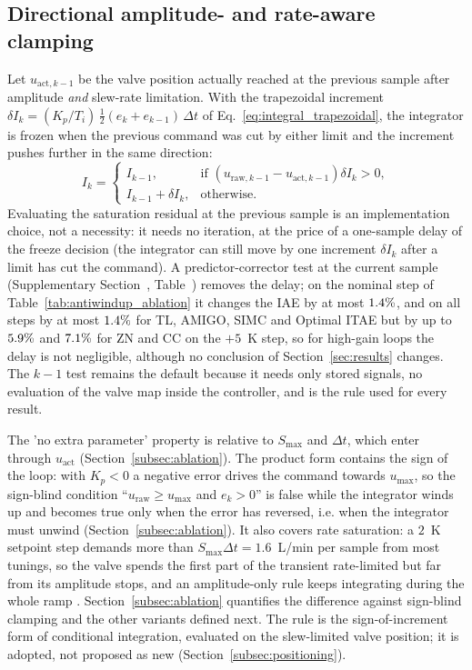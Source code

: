 \subsection{Directional amplitude- and rate-aware clamping}
\label{subsec:clamping_rule}
Let $u_{\text{act},k-1}$ be the valve position actually reached at the previous sample after amplitude \emph{and} slew-rate limitation. With the trapezoidal increment $\delta I_k = (K_p/T_i)\,\tfrac{1}{2}(e_k + e_{k-1})\,\Delta t$ of Eq.~\eqref{eq:integral_trapezoidal}, the integrator is frozen when the previous command was cut by either limit and the increment pushes further in the same direction:
\begin{equation}
    I_k = \begin{cases}
        I_{k-1}, & \text{if } \left(u_{\text{raw},k-1} - u_{\text{act},k-1}\right)\delta I_k > 0, \\
        I_{k-1} + \delta I_k, & \text{otherwise.}
    \end{cases}
    \label{eq:clamping_antiwindup}
\end{equation}
Evaluating the saturation residual at the previous sample is an implementation choice, not a necessity: it needs no iteration, at the price of a one-sample delay of the freeze decision (the integrator can still move by one increment $\delta I_k$ after a limit has cut the command). A predictor-corrector test at the current sample (Supplementary Section~, Table~) removes the delay; on the nominal step of Table~\ref{tab:antiwindup_ablation} it changes the IAE by at most $1.4\%$, and on all steps by at most $1.4\%$ for TL, AMIGO, SIMC and Optimal ITAE but by up to $5.9\%$ and $7.1\%$ for ZN and CC on the $+5$~K step, so for high-gain loops the delay is not negligible, although no conclusion of Section~\ref{sec:results} changes. The $k-1$ test remains the default because it needs only stored signals, no evaluation of the valve map inside the controller, and is the rule used for every result.

The 'no extra parameter' property is relative to $S_{\max}$ and $\Delta t$, which enter through $u_{\text{act}}$ (Section~\ref{subsec:ablation}). The product form contains the sign of the loop: with $K_p < 0$ a negative error drives the command towards $u_{\max}$, so the sign-blind condition ``$u_{\text{raw}} \ge u_{\max}$ and $e_k > 0$'' is false while the integrator winds up and becomes true only when the error has reversed, i.e. when the integrator must unwind (Section~\ref{subsec:ablation}). It also covers rate saturation: a $2$~K setpoint step demands more than $S_{\max}\Delta t = 1.6$~L/min per sample from most tunings, so the valve spends the first part of the transient rate-limited but far from its amplitude stops, and an amplitude-only rule keeps integrating during the whole ramp \cite{bohn1995analysis, peng1996nonlinear}. Section~\ref{subsec:ablation} quantifies the difference against sign-blind clamping and the other variants defined next. The rule is the sign-of-increment form of conditional integration, evaluated on the slew-limited valve position; it is adopted, not proposed as new (Section~\ref{subsec:positioning}).


